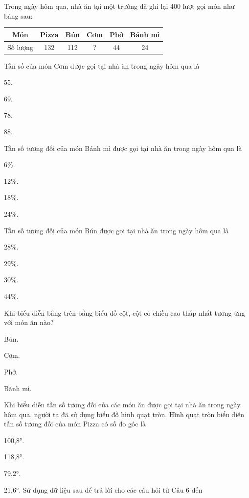 \documentclass[%
    fontsize=12pt,%
    chapterprefix=false,%
    open=right,%
    twoside=false,%
    numbers=noenddot,%
    headings=optiontohead,%
    final,%
    DIV=15,%
    parskip=half %
]{scrbook}
\begin{document}
\begin{tracnghiem}

\item Trong ngày hôm qua, nhà ăn tại một trường đã ghi lại 400 lượt gọi món như bảng sau: \begin{tabular}{|c|c|c|c|c|c|} \hline Món & Pizza & Bún & Cơm & Phở & Bánh mì \\ \hline Số lượng & 132 & 112 & ? & 44 & 24 \\ \hline \end{tabular}

\item Tần số của món Cơm được gọi tại nhà ăn trong ngày hôm qua là
\begin{options}
  \item 55.
  \item 69.
  \item 78.
  \item 88.
\end{options}

\item Tần số tương đối của món Bánh mì được gọi tại nhà ăn trong ngày hôm qua là
\begin{options}
  \item 6\%.
  \item 12\%.
  \item 18\%.
  \item 24\%.
\end{options}

\item Tần số tương đối của món Bún được gọi tại nhà ăn trong ngày hôm qua là
\begin{options}
  \item 28\%.
  \item 29\%.
  \item 30\%.
  \item 44\%.
\end{options}

\item Khi biểu diễn bằng trên bằng biểu đồ cột, cột có chiều cao thấp nhất tương ứng với món ăn nào?
\begin{options}
  \item Bún.
  \item Cơm.
  \item Phở.
  \item Bánh mì.
\end{options}

\item Khi biểu diễn tần số tương đối của các món ăn được gọi tại nhà ăn trong ngày hôm qua, người ta đã sử dụng biểu đồ hình quạt tròn. Hình quạt tròn biểu diễn tần số tương đối của món Pizza có số đo góc là
\begin{options}
  \item 100,8°.
  \item 118,8°.
  \item 79,2°.
  \item 21,6°. Sử dụng dữ liệu sau để trả lời cho các câu hỏi từ Câu 6 đến
\end{options}


\end{tracnghiem}
\end{document}
